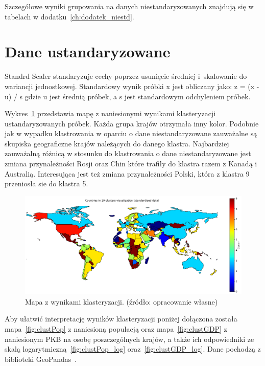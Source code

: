 \documentclass[11pt]{report}
\begin{document}
    Szczegółowe wyniki grupowania na danych niestandaryzowanych znajdują się w tabelach w dodatku~\ref{ch:dodatek_niestd}.


    \section{Dane ustandaryzowane}\label{sec:dane-ustandaryzowane}
    Standrd Scaler standaryzuje cechy poprzez usunięcie średniej i~skalowanie do wariancji jednostkowej.
    Standardowy wynik próbki x jest obliczany jako:
    z = (x - u) / s
    gdzie u jest średnią próbek, a s jest standardowym odchyleniem próbek.

    Wykres~\ref{fig:clust10std} przedstawia mapę z naniesionymi wynikami klasteryzacji ustandaryzowanych próbek.
    Każda grupa krajów otrzymała inny kolor.
    Podobnie jak w wypadku klastrowania w oparciu o dane niestandaryzowane zauważalne są skupiska geograficzne krajów należących do danego klastra.
    Najbardziej zauważalną różnicą w stosunku do klastrowania o dane niestandaryzowane jest zmiana przynależności Rosji oraz Chin które trafiły do klastra razem z Kanadą i Australią.
    Interesująca jest też zmiana przynależności Polski, która z klastra 9 przeniosła sie do klastra 5.

    \begin{figure}[!htp]
        \centering
        \includegraphics[width=\linewidth]{fig/CLUST/10clusterMap_std.png}
        \caption{Mapa z wynikami klasteryzacji. (źródło: opracowanie własne)}
        \label{fig:clust10std}
    \end{figure}

    Aby ułatwić interpretację wyników klasteryzacji poniżej dołączona została mapa~\ref{fig:clustPop} z naniesioną populacją oraz mapa~\ref{fig:clustGDP} z naniesionym PKB na osobę poszczególnych krajów, a także ich odpowiedniki ze skalą logarytmiczną~\ref{fig:clustPop_log} oraz~\ref{fig:clustGDP_log}.
    Dane pochodzą z biblioteki GeoPandas~\cite{geopandas}.
\end{document}
